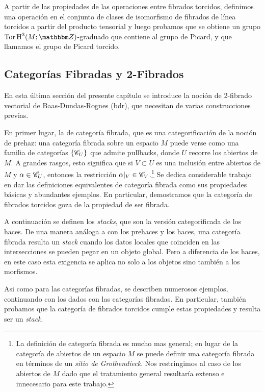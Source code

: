 {A partir de las propiedades de las operaciones entre fibrados
torcidos, definimos una operaci\'on en el conjunto de clases de
isomorfismo de fibrados de l\'inea torcidos a partir del producto
tensorial y luego probamos que se obtiene un grupo
$\opnm{Tor}\opnm{H}^3(M;\ent )$-graduado que contiene al grupo de
Picard, y que llamamos el grupo de Picard torcido.

\subsection{Categor\'ias Fibradas y 2-Fibrados}

En esta \'ultima secci\'on del presente cap\'itulo se introduce la noci\'on de 2-fibrado vectorial de Baas-Dundas-Rognes ({\sc bdr}), que necesitan de varias construcciones previas.

En primer lugar, la de categor\'ia fibrada, que es una categorificaci\'on de la noci\'on de prehaz: una categor\'ia fibrada sobre un espacio $M$ puede verse como una familia de categor\'ias $\{\mathscr{C}_U\}$ que admite pullbacks, donde $U$ recorre los abiertos de $M$. A grandes rasgos, esto significa que si $V\subset U$ es una inclusi\'on entre abiertos de $M$ y $\alpha \in \mathscr{C}_U$, entonces la restricci\'on $\alpha |_V\in \mathscr{C}_V$.\footnote{La definici\'on de categor\'ia fibrada es mucho mas general; en lugar de la categor\'ia de abiertos de un espacio $M$ se puede definir una categor\'ia fibrada en t\'erminos de un \emph{sitio de Grothendieck}. Nos restringimos al caso de los abiertos de $M$ dado que el tratamiento general resultar\'ia extenso e innecesario para este trabajo.} Se dedica considerable trabajo en dar las definiciones equivalentes de categor\'ia fibrada como sus propiedades b\'asicas y abundantes ejemplos. En particular, demostramos que la categor\'ia de fibrados torcidos goza de la propiedad de ser fibrada.

A continuaci\'on se definen los \emph{stacks}, que son la versi\'on categorificada de los haces. De una manera an\'aloga a con los prehaces y los haces, una categor\'ia fibrada resulta un \emph{stack} cuando los datos locales que coinciden en las intersecciones se pueden pegar en un objeto global. Pero a diferencia de los haces, en este caso esta exigencia se aplica no solo a los objetos sino tambi\'en a los morfismos.

Asi como para las categor\'ias fibradas, se describen numerosos ejemplos, continuando con los dados con las categor\'ias fibradas. En particular, tambi\'en probamos que la categor\'ia de fibrados torcidos cumple estas propiedades y resulta ser un \emph{stack}.

}
